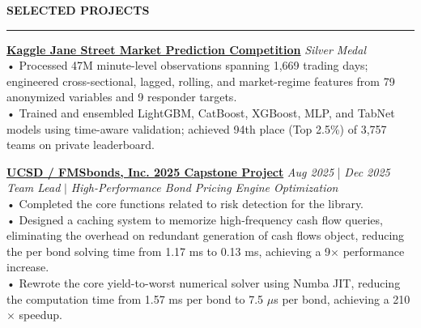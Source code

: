 \documentclass{resume} %
\renewcommand{\sectionskip}{\vspace{0.10cm}}        %
\renewcommand{\sectionlineskip}{\vspace{0.10cm}}
\renewenvironment{rSection}[1]{
\sectionskip
\textcolor{UC San Diego Blue}{\textbf{\large\bfseries\MakeUppercase{#1}}}

\sectionlineskip
\hrule
\begin{list}{}{
\setlength{\leftmargin}{0em}
}
\item[]
}{
\end{list}
}
\begin{document}
\begin{rSection}{SELECTED PROJECTS}

\noindent
\href{https://github.com/YuankaiTao-super/Kaggle2024-Jane-Street-Real-Time-Market-Data-Forecasting}{\textbf{Kaggle Jane Street Market Prediction Competition}} \hfill \textit{Silver Medal}\\
• Processed 47M minute-level observations spanning 1,669 trading days; engineered cross-sectional, lagged, rolling, and market-regime features from 79 anonymized variables and 9 responder targets.\\[1.5pt]
• Trained and ensembled LightGBM, CatBoost, XGBoost, MLP, and TabNet models using time-aware validation; achieved 94th place (Top 2.5\%) of 3,757 teams on private leaderboard.


\noindent
\href{https://github.com/YuankaiTao-super/Capstone_FMS_2025}{\textbf{UCSD / FMSbonds, Inc. 2025 Capstone Project}} \hfill {\em Aug 2025} | {\em Dec 2025}\\
\textit{Team Lead} $|$ \textit{High-Performance Bond Pricing Engine Optimization}\\[4pt]
• Completed the core functions related to risk detection for the library.\\[1.5pt]
• Designed a caching system to memorize high-frequency cash flow queries, eliminating the overhead on redundant generation of cash flows object, reducing the per bond solving time from 1.17 ms to 0.13 ms, achieving a 9$\times$ performance increase.\\[1.5pt]
• Rewrote the core yield-to-worst numerical solver using Numba JIT, reducing the computation time from 1.57 ms per bond to 7.5 $\mu$s per bond, achieving a 210$\times$ speedup. 



\end{rSection}
\end{document}
